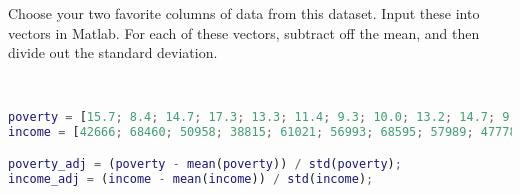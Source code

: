 Choose your two favorite columns of data from this dataset. Input these into vectors in Matlab. For each of these vectors, subtract off the mean, and then divide out the standard deviation.

\begin{solution}\
    \begin{lstlisting}[language=Matlab]
poverty = [15.7; 8.4; 14.7; 17.3; 13.3; 11.4; 9.3; 10.0; 13.2; 14.7; 9.1; 12.6];
income = [42666; 68460; 50958; 38815; 61021; 56993; 68595; 57989; 47778; 50861; 67214; 47576];

poverty_adj = (poverty - mean(poverty)) / std(poverty);
income_adj = (income - mean(income)) / std(income);
    \end{lstlisting}
\end{solution}
